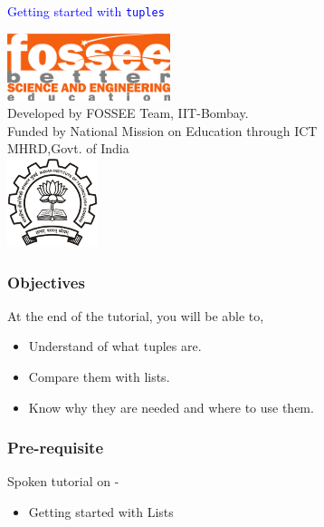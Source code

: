 \documentclass[presentation]{beamer}
\title{}
\author{FOSSEE}
\date{}
\begin{document}
\begin{frame}

\begin{center}
\vspace{12pt}
\textcolor{blue}{\huge Getting started with \texttt{tuples}}
\end{center}
\vspace{18pt}
\begin{center}
\vspace{10pt}
\includegraphics[scale=0.95]{../images/fossee-logo.png}\\
\vspace{5pt}
\scriptsize Developed by FOSSEE Team, IIT-Bombay. \\ 
\scriptsize Funded by National Mission on Education through ICT\\
\scriptsize  MHRD,Govt. of India\\
\includegraphics[scale=0.30]{../images/iitb-logo.png}\\
\end{center}
\end{frame}
\begin{frame}
\frametitle{Objectives}
\label{sec-2}

  At the end of the tutorial, you will be able to,


\begin{itemize}
\item Understand of what tuples are.
\item Compare them with lists.
\item Know why they are needed and where to use them.
\end{itemize}
\end{frame}
\begin{frame}
\frametitle{Pre-requisite}
\label{sec-3}

Spoken tutorial on -

\begin{itemize}
\item Getting started with Lists
\end{itemize}
\end{frame}
\end{document}
